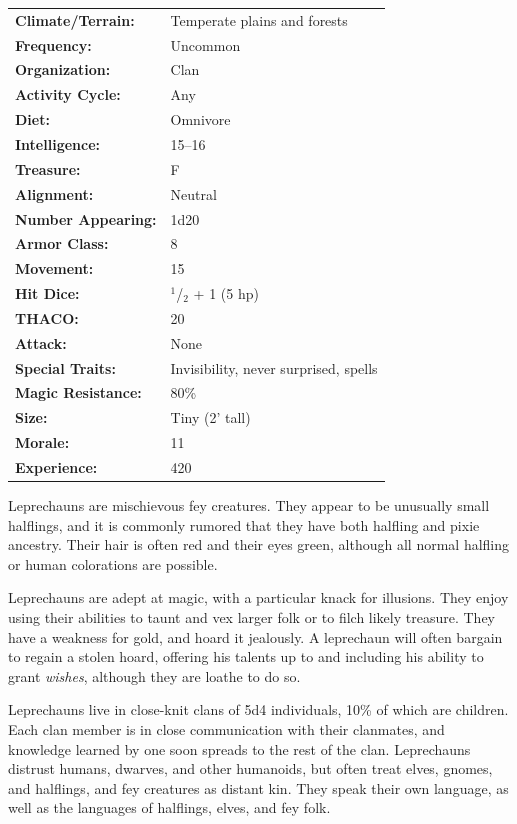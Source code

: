 \begin{multicols}{2}
\begin{minipage}{\columnwidth}
\noindent \begin{tabular}{p{}p{}}
\textbf{Climate/Terrain:}	& Temperate plains and forests	\\
\textbf{Frequency:} 		& Uncommon	\\
\textbf{Organization:} 		& Clan	\\
\textbf{Activity Cycle:} 	& Any	\\
\textbf{Diet:} 				& Omnivore	\\
\textbf{Intelligence:} 		& 15--16	\\
\textbf{Treasure:} 			& F	\\
\textbf{Alignment:} 		& Neutral	\\
\hline
\textbf{Number Appearing:} 	& 1d20	\\
\textbf{Armor Class:} 		& 8	\\
\textbf{Movement:} 			& 15	\\
\textbf{Hit Dice:} 			& $^1$/$_2$ + 1 (5 hp)	\\
\textbf{THACO:} 			& 20	\\
\textbf{Attack:} 			& None	\\
\textbf{Special Traits:} & Invisibility, never surprised, spells	\\
\textbf{Magic Resistance:} 	& 80\%	\\
\textbf{Size:} 				& Tiny (2' tall)	\\
\textbf{Morale:} 			& 11	\\
\textbf{Experience:} 		& 420	\\ %
\end{tabular}

\end{minipage}

Leprechauns are mischievous fey creatures. They appear to be unusually small halflings, and it is commonly rumored that they have both halfling and pixie ancestry. Their hair is often red and their eyes green, although all normal halfling or human colorations are possible.

Leprechauns are adept at magic, with a particular knack for illusions. They enjoy using their abilities to taunt and vex larger folk or to filch likely treasure. They have a weakness for gold, and hoard it jealously. A leprechaun will often bargain to regain a stolen hoard, offering his talents up to and including his ability to grant \textit{wishes}, although they are loathe to do so.

Leprechauns live in close-knit clans of 5d4 individuals, 10\% of which are children. Each clan member is in close communication with their clanmates, and knowledge learned by one soon spreads to the rest of the clan. Leprechauns distrust humans, dwarves, and other humanoids, but often treat elves, gnomes, and halflings, and fey creatures as distant kin. They speak their own language, as well as the languages of halflings, elves, and fey folk.


\end{multicols}
